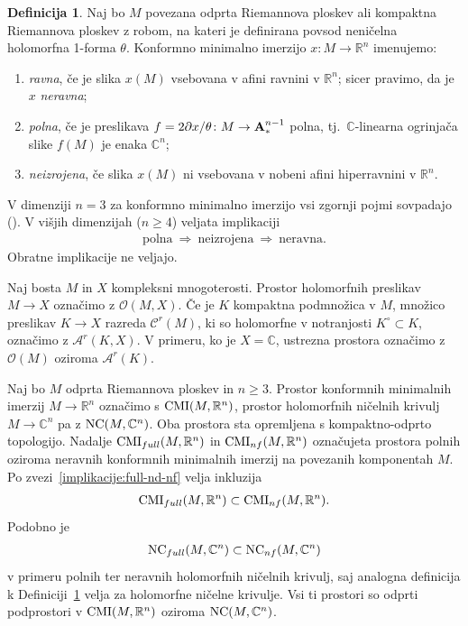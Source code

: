 \documentclass[12pt,a4paper,twoside]{article}
\theoremstyle{definition} %
\newtheorem{definicija}{Definicija}[section]
\theoremstyle{plain} %
\numberwithin{equation}{section}  %
\newcommand{\R}{\mathbb R}
\newcommand{\C}{\mathbb C}
\begin{document}
\begin{definicija} \label{def:full-flat-nd}
Naj bo $M$ povezana odprta Riemannova ploskev ali kompaktna Riemannova ploskev z robom, na kateri je definirana povsod neničelna holomorfna 1-forma $\theta$. Konformno minimalno imerzijo $x \colon M \to \R^{n}$ imenujemo:
\begin{enumerate}
\item \emph{ravna}, če je slika $x(M)$ vsebovana v afini ravnini v $\R^{n}$; sicer pravimo, da je $x$ \emph{neravna};
\item \emph{polna}, če je preslikava $f = 2 \partial{x} / \theta \colon M \to \textbf{\textup{A}}_{*}^{n-1}$ polna, tj.~$\C$-linearna ogrinjača slike $f(M)$ je enaka $\C^{n}$;
\item \emph{neizrojena}, če slika $x(M)$ ni vsebovana v nobeni afini hiperravnini v $\R^{n}$. 
\end{enumerate}
\end{definicija}

V dimenziji  $n=3$ za konformno minimalno imerzijo vsi zgornji pojmi sovpadajo (\cite[Lemma~12.4]{osserman2002survey}). V višjih dimenzijah ($n \geq 4$) veljata implikaciji
\begin{gather} \label{implikacije:full-nd-nf}
\text{polna} \ \Rightarrow \ \text{neizrojena} \ \Rightarrow \ \text{neravna}.
\end{gather}
Obratne implikacije ne veljajo.

Naj bosta $M$ in $X$ kompleksni mnogoterosti. Prostor holomorfnih preslikav $M \to X$ označimo z $\mathcal{O}(M,X)$.
Če je $K$ kompaktna podmnožica v $M$, množico preslikav $K \to X$ razreda $\mathcal{C}^{r}(M)$, ki so holomorfne v notranjosti $K^\circ \subset K$, označimo z $\mathcal{A}^{r}(K,X)$.
V primeru, ko je $X = \C$, ustrezna prostora označimo z $\mathcal{O}(M)$ oziroma $\mathcal{A}^{r}(K)$.

Naj bo $M$ odprta Riemannova ploskev in $n \geq 3$. Prostor konformnih minimalnih imerzij $M \to \R^{n}$ označimo s $\textup{CMI}(M, \R^{n})$, prostor holomorfnih ničelnih krivulj $M \to \C^{n}$ pa z $\textup{NC}(M, \C^{n})$. Oba prostora sta opremljena s kompaktno-odprto topologijo.
Nadalje $\textup{CMI}_{full}(M, \R^{n})$ in $\textup{CMI}_{nf}(M, \R^{n})$ označujeta prostora polnih oziroma neravnih konformnih minimalnih imerzij na povezanih komponentah $M$. Po zvezi~\eqref{implikacije:full-nd-nf} velja inkluzija 
\begin{gather*}
\textup{CMI}_{full}(M, \R^{n}) \subset \textup{CMI}_{nf}(M, \R^{n}).
\end{gather*}
%
Podobno je 
\begin{gather*}
\textup{NC}_{full}(M, \C^{n}) \subset \textup{NC}_{nf}(M, \C^{n})
\end{gather*} 
v primeru polnih ter neravnih holomorfnih ničelnih krivulj, saj analogna definicija k Definiciji~\ref{def:full-flat-nd} velja za holomorfne ničelne krivulje. Vsi ti prostori so odprti podprostori v $\textup{CMI}(M, \R^{n})$ oziroma $\textup{NC}(M, \C^{n})$.
\end{document}
